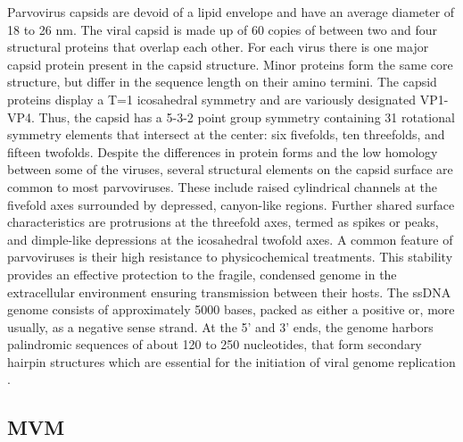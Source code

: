 Parvovirus capsids are devoid of a lipid envelope and have an average diameter of 18 to 26 nm. The viral capsid is made up of 60 copies of between two and four structural proteins that overlap each other. For each virus there is one major capsid protein present in the capsid structure. Minor proteins form the same core structure, but differ in the sequence length on their amino termini. The capsid proteins display a T=1 icosahedral symmetry and are variously designated VP1-VP4. Thus, the capsid has a 5-3-2 point group symmetry containing 31 rotational symmetry elements that intersect at the center: six fivefolds, ten threefolds, and fifteen twofolds. 
Despite the differences in protein forms and the low homology between some of the viruses, several structural elements on the capsid surface are common to most parvoviruses. These include raised cylindrical channels at the fivefold axes surrounded by depressed, canyon-like regions. Further shared surface characteristics are protrusions at the threefold axes, termed as spikes or peaks, and dimple-like depressions at the icosahedral twofold axes.  
A common feature of parvoviruses is their high resistance to physicochemical treatments. This stability provides an effective protection to the fragile, condensed genome in the extracellular environment ensuring transmission between their hosts. The ssDNA  genome consists of approximately 5000 bases, packed as either a positive or, more usually, as a negative sense strand. At the 5’ and 3’ ends, the genome harbors palindromic sequences of about 120 to 250 nucleotides, that form secondary hairpin structures which are essential for the initiation of viral genome replication \cite{pmid16242744, pmid25555192, pmid8392729, pmid9817841, pmid11827486, pmid2006420, pmid12941411}. \\      









\subsection{MVM}

